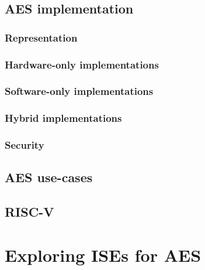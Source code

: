 \documentclass[preprint]{iacrtrans}
\begin{document}
\subsection{AES implementation}
\label{sec:bg:aes_impl}

\subsubsection{Representation}
\label{sec:bg:aes_impl_rep}


\subsubsection{Hardware-only implementations}
\label{sec:bg:aes_impl_hw}

\subsubsection{Software-only implementations}
\label{sec:bg:aes_impl_sw}

\subsubsection{Hybrid        implementations}
\label{sec:bg:aes_impl_ise}


\subsubsection{Security}
\label{sec:bg:aes_impl_sec}



\subsection{AES  use-cases}
\label{sec:bg:aes_usage}



\subsection{RISC-V}
\label{sec:bg:riscv}



\section{Exploring ISEs for AES}
\label{sec:ise}
\end{document}
